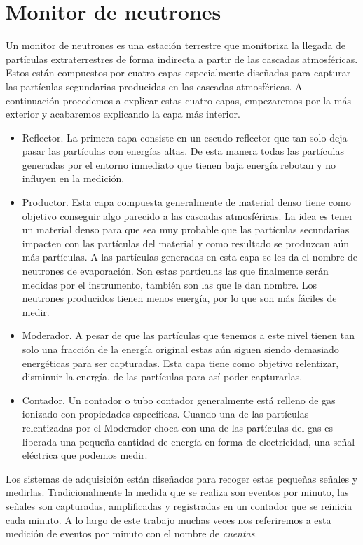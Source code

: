 \section{Monitor de neutrones}
	Un monitor de neutrones es una estación terrestre que monitoriza la llegada de partículas extraterrestres de forma indirecta a partir de las
	cascadas atmosféricas. Estos están compuestos por cuatro capas especialmente diseñadas para capturar las partículas segundarias producidas en
	las cascadas atmosféricas. A continuación procedemos a explicar estas cuatro capas, empezaremos por la más exterior y acabaremos explicando la
	capa más interior.
	\begin{itemize}
		\item	Reflector. La primera capa consiste en un escudo reflector que tan solo deja pasar las partículas con energías altas. De esta
			manera todas las partículas generadas por el entorno inmediato que tienen baja energía rebotan y no influyen en la medición.
		\item	Productor. Esta capa compuesta generalmente de material denso tiene como objetivo conseguir algo parecido a las cascadas
			atmosféricas. La idea es tener un material denso para que sea muy probable que las partículas secundarias impacten con las
			partículas del material y como resultado se produzcan aún más partículas. A las partículas generadas en esta capa se les da el
			nombre de neutrones de evaporación. Son estas partículas las que finalmente serán medidas por el instrumento, también son las
			que le dan nombre. Los neutrones producidos tienen menos energía, por lo que son más fáciles de medir.
		\item	Moderador. A pesar de que las partículas que tenemos a este nivel tienen tan solo una fracción de la energía original estas
			aún siguen siendo demasiado energéticas para ser capturadas. Esta capa tiene como objetivo relentizar, disminuir la energía,
			de las partículas para así poder capturarlas.
		\item	Contador. Un contador o tubo contador generalmente está relleno de gas ionizado con propiedades específicas. Cuando una de
			las partículas relentizadas por el Moderador choca con una de las partículas del gas es liberada una pequeña cantidad de
			energía en forma de electricidad, una señal eléctrica que podemos medir. 
	\end{itemize}
	\par
	Los sistemas de adquisición están diseñados para recoger estas pequeñas señales y medirlas. Tradicionalmente la medida que se realiza son
	eventos por minuto, las señales son capturadas, amplificadas y registradas en un contador que se reinicia cada minuto. A lo largo de este
	trabajo muchas veces nos referiremos a esta medición de eventos por minuto con el nombre de \emph{cuentas}. 

